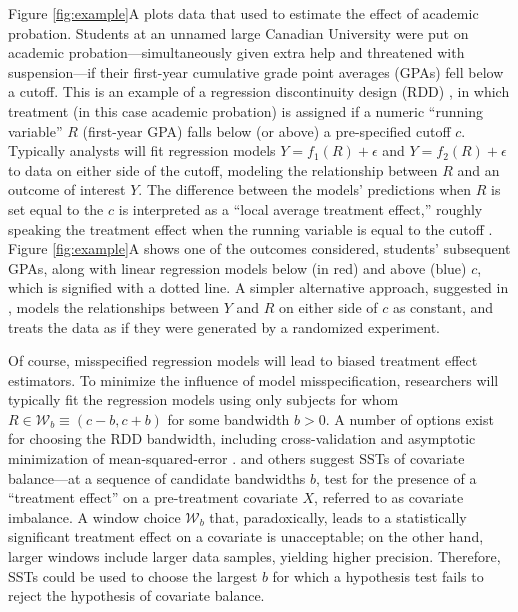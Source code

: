 \documentclass[12pt]{article}\usepackage[]{graphicx}\usepackage[]{color}
\begin{document}
Figure \ref{fig:example}A plots data that \citet{lso} used to estimate the effect of academic
probation.
Students at an unnamed large Canadian University were put on academic
probation---simultaneously given extra help and threatened with
suspension---if their first-year cumulative grade point averages
(GPAs) fell below a cutoff.
This is an example of a regression discontinuity design (RDD) \citep{thistlewhiteCampbell}, in
which treatment (in this case academic probation) is assigned if a
numeric ``running variable'' $R$ (first-year GPA) falls below (or above) a
pre-specified cutoff $c$.
Typically \citep[e.g.][]{imbensLemiuxRDD,angristLavy,lee} analysts
will fit regression models $Y=f_1(R)+\epsilon$ and $Y=f_2(R)+\epsilon$
to data on either side of the cutoff, modeling the relationship
between $R$ and an outcome of interest $Y$.
The difference between the models' predictions when $R$ is set equal
to the $c$ is interpreted as a ``local
average treatment effect,'' roughly speaking the treatment effect when
the running variable is equal to the cutoff \citep{HTV}.
Figure \ref{fig:example}A shows one of the outcomes \citet{lso} considered,
students' subsequent GPAs, along with linear regression models below
(in red) and above (blue) $c$, which is signified with a dotted
line.
A simpler alternative approach, suggested in \citet{cft}, models the
relationships between $Y$ and $R$ on either side of $c$ as constant,
and treats the data as if they were generated by a randomized
experiment.

Of course, misspecified regression models will lead to biased
treatment effect estimators.
To minimize the influence of model misspecification, researchers will
typically fit the regression models using only subjects for whom $R\in
\mathcal{W}_b\equiv (c-b,c+b)$ for some bandwidth $b>0$.
A number of options exist for choosing the RDD bandwidth, including
cross-validation \citep{ludwigMiller} and asymptotic minimization of
mean-squared-error \citep{IK}.
\citet{cft} and others \citet{salesHansen,angristWanna} suggest SSTs
of covariate balance---at a sequence of candidate bandwidths $b$, test
for the presence of a ``treatment effect'' on a pre-treatment
covariate $X$, referred to as covariate imbalance.
A window choice $\mathcal{W}_b$ that, paradoxically, leads to a
statistically significant
treatment effect on a covariate is unacceptable; on the other
hand, larger windows include larger data samples, yielding higher
precision.
Therefore, SSTs could be used to choose the largest $b$ for which a
hypothesis test fails to reject the hypothesis of covariate balance.
\end{document}
